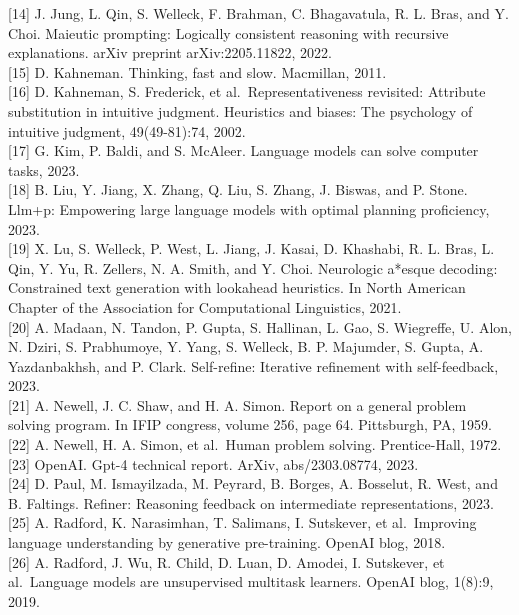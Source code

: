 \documentclass[
]{article}
\begin{document}
{[}14{]} J. Jung, L. Qin, S. Welleck, F. Brahman, C. Bhagavatula, R. L.
Bras, and Y. Choi. Maieutic prompting: Logically consistent reasoning
with recursive explanations. arXiv preprint arXiv:2205.11822, 2022.\\
{[}15{]} D. Kahneman. Thinking, fast and slow. Macmillan, 2011.\\
{[}16{]} D. Kahneman, S. Frederick, et al.~Representativeness revisited:
Attribute substitution in intuitive judgment. Heuristics and biases: The
psychology of intuitive judgment, 49(49-81):74, 2002.\\
{[}17{]} G. Kim, P. Baldi, and S. McAleer. Language models can solve
computer tasks, 2023.\\
{[}18{]} B. Liu, Y. Jiang, X. Zhang, Q. Liu, S. Zhang, J. Biswas, and P.
Stone. Llm+p: Empowering large language models with optimal planning
proficiency, 2023.\\
{[}19{]} X. Lu, S. Welleck, P. West, L. Jiang, J. Kasai, D. Khashabi, R.
L. Bras, L. Qin, Y. Yu, R. Zellers, N. A. Smith, and Y. Choi. Neurologic
a*esque decoding: Constrained text generation with lookahead heuristics.
In North American Chapter of the Association for Computational
Linguistics, 2021.\\
{[}20{]} A. Madaan, N. Tandon, P. Gupta, S. Hallinan, L. Gao, S.
Wiegreffe, U. Alon, N. Dziri, S. Prabhumoye, Y. Yang, S. Welleck, B. P.
Majumder, S. Gupta, A. Yazdanbakhsh, and P. Clark. Self-refine:
Iterative refinement with self-feedback, 2023.\\
{[}21{]} A. Newell, J. C. Shaw, and H. A. Simon. Report on a general
problem solving program. In IFIP congress, volume 256, page 64.
Pittsburgh, PA, 1959.\\
{[}22{]} A. Newell, H. A. Simon, et al.~Human problem solving.
Prentice-Hall, 1972.\\
{[}23{]} OpenAI. Gpt-4 technical report. ArXiv, abs/2303.08774, 2023.\\
{[}24{]} D. Paul, M. Ismayilzada, M. Peyrard, B. Borges, A. Bosselut, R.
West, and B. Faltings. Refiner: Reasoning feedback on intermediate
representations, 2023.\\
{[}25{]} A. Radford, K. Narasimhan, T. Salimans, I. Sutskever, et
al.~Improving language understanding by generative pre-training. OpenAI
blog, 2018.\\
{[}26{]} A. Radford, J. Wu, R. Child, D. Luan, D. Amodei, I. Sutskever,
et al.~Language models are unsupervised multitask learners. OpenAI blog,
1(8):9, 2019.\\
\end{document}
